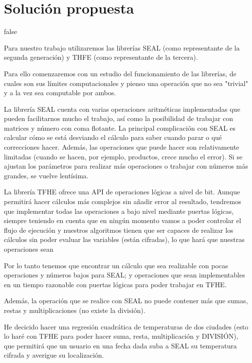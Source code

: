 \chapter{Solución propuesta}
\label{chap:poc}

\if false

Para nuestro trabajo utilizaremos las librerías SEAL (como representante de la segunda generación) y THFE (como representante de la tercera).

Para ello comenzaremos con un estudio del funcionamiento de las librerías, de cuales son sus límites computacionales y pienso una operación que no sea "trivial" y a la vez sea computable por ambos.

La librería SEAL cuenta con varias operaciones aritméticas implementadas que pueden facilitarnos mucho el trabajo, así como la posibilidad de trabajar con matrices y número con coma flotante. La principal complicación con SEAL es calcular cómo se está desviando el cálculo para saber cuando parar o qué correcciones hacer. Además, las operaciones que puede hacer son relativamente limitadas (cuando se hacen, por ejemplo, productos, crece mucho el error). Si se ajustan los parámetros para realizar más operaciones o trabajar con números más grandes, se vuelve lentísima.

La librería TFHE ofrece una API de operaciones lógicas a nivel de bit. Aunque permitirá hacer cálculos más complejos sin añadir error al resultado, tendremos que implementar todas las operaciones a bajo nivel mediante puertas lógicas, siempre teniendo en cuenta que en ningún momento vamos a poder controlar el flujo de ejecución y nuestros algoritmos tienen que ser capaces de realizar los cálculos sin poder evaluar las variables (están cifradas), lo que hará que nuestras operaciones sean

Por lo tanto tenemos que encontrar un cálculo que sea realizable con pocas operaciones y números bajos para SEAL; y operaciones que sean implementables en un tiempo razonable con puertas lógicas para poder trabajar en TFHE.

Además, la operación que se realice con SEAL no puede contener más que sumas, restas y multiplicaciones (no existe la división).

He decicido hacer una regresión cuadrática de temperaturas de dos ciudades (esto lo haré con TFHE para poder hacer suma, resta, multiplicación y DIVISIÓN), que permitirá que un usuario en una fecha dada suba a SEAL su temperatura cifrada y averigue su localización.

